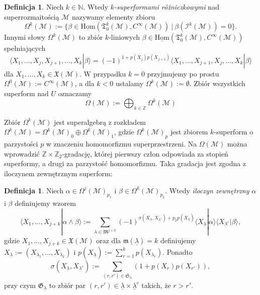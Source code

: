 \documentclass[11pt,a4paper]{report}
\theoremstyle{definition}
\newtheorem{definition}[theorem]{Definicja}
\begin{document}
\begin{definition}
Niech $k \in \mathbb{N}$. Wtedy \textit{$k$-superformami różniczkowymi} nad superrozmaitością $\mathcal{M}$ nazywamy elementy zbioru
\begin{equation*}
\Omega^k (\mathcal{M}) := \{ \beta \in \underline{\mathrm{Hom}} (\mathfrak T^k_0(\mathcal{M}), C^\infty(\mathcal{M})) \ |\ \beta (\mathcal{I}^k\mathcal{(M)}) = 0\}.
\end{equation*}
Innymi słowy $\Omega^k (\mathcal{M})$ to zbiór $k$-liniowych $\beta \in \underline{\mathrm{Hom}} (\mathfrak T^k_0(\mathcal{M}), C^\infty(\mathcal{M}))$ spełniających
\begin{equation*}
\langle X_1,\ldots, X_j,X_{j+1},\ldots,X_k|\beta\rangle=(-1)^{1+p(X_j)p(X_{j+1})}\langle X_1,\ldots,X_{j+1},X_j,\ldots,X_k|\beta\rangle
\end{equation*}
dla $X_1, \ldots, X_k \in \mathfrak{X} (\mathcal{M})$. W przypadku $k=0$ przyjmujemy po prostu $\Omega^0 (\mathcal{M}) := C^\infty(\mathcal{M})$, a dla $k < 0$ ustalamy $\Omega^k (\mathcal{M}) := \emptyset$. Zbiór wszystkich superform nad $U$ oznaczamy
\begin{equation*}
\Omega (\mathcal{M}) := \bigoplus_{k \in \mathbb{Z}} \Omega^k (\mathcal{M})
\end{equation*}
\end{definition}

Zbiór $\Omega^k (\mathcal{M})$ jest superalgebrą z rozkładem $\Omega^k (\mathcal{M}) =\Omega^k (\mathcal{M})_0 \oplus \Omega^k (\mathcal{M})_1$, gdzie $\Omega^k (\mathcal{M})_p$ jest zbiorem $k$-superform o parzystości $p$ w znaczeniu homomorfizmu superprzestrzeni. Na $\Omega(\mathcal{M})$ można wprowadzić $\mathbb{Z}\times \mathbb{Z}_2$-gradację, której pierwszy człon odpowiada za stopień superformy, a drugi za parzystość homomorfizmu. Taka gradacja jest zgodna z iloczynem zewnętrznym superform:

\begin{definition}\label{iloczynsup}
Niech $\alpha \in \Omega^j (\mathcal{M})_{p_1}\!$ i $\beta\in \Omega^k (\mathcal{M})_{p_2}$. Wtedy \textit{iloczyn zewnętrzny} $\alpha$ i $\beta$ definiujemy wzorem
\begin{equation*}
\langle X_1, \ldots, X_{j+k} | \alpha\wedge\beta\rangle := 
\sum_{\underline \lambda\in \mathfrak M^{j+k}}(-1)^{\sigma(X_{\underline \lambda},X_{\underline \lambda^c})+p_2 p(X_{\underline \lambda})} \langle X_{\underline \lambda} | \alpha \rangle \langle X_{\underline \lambda^c}| \beta \rangle,
\end{equation*}
gdzie $X_1, \ldots, X_{j+k} \in \mathfrak{X}({\mathcal M})$ oraz dla $\mathfrak{m}(\underline \lambda) =k$ definiujemy $X_{\underline \lambda} := (X_{\lambda_1},\ldots,X_{\lambda_k})$ i $p(X_{\underline \lambda}) :=\sum_{r=1}^kp(X_{\lambda_r})$. Ponadto
\begin{equation*}
\sigma(X_{\underline \lambda},X_{\underline \lambda^c}) := \sum_{(r, r') \in \mathfrak S_{\underline{\lambda}}} (1+p(X_r)p(X_{r'})),
\end{equation*}
przy czym $\mathfrak{G}_{\underline{\lambda}}$ to zbiór par $(r,r') \in \underline \lambda \times \underline \lambda^c$ takich, że $r > r'.$
\end{definition}
\end{document}
